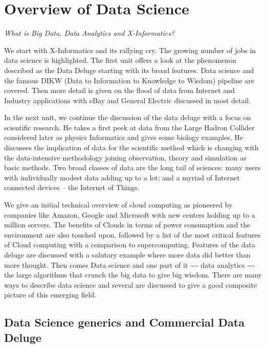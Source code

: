 

\chapter{Overview of Data Science}\label{overview-of-data-science}

\FILENAME

\emph{What is Big Data, Data Analytics and X-Informatics?}

We start with X-Informatics and its rallying cry.
The growing number of jobs in data science is highlighted. The first
unit offers a look at the phenomenon described as the Data Deluge
starting with its broad features. Data science and the famous DIKW (Data
to Information to Knowledge to Wisdom) pipeline are covered. Then more
detail is given on the flood of data from Internet and Industry
applications with eBay and General Electric discussed in most detail.

In the next unit, we continue the discussion of the data deluge with a
focus on scientific research. He takes a first peek at data from the
Large Hadron Collider considered later as physics Informatics and gives
some biology examples. He discusses the implication of data for the
scientific method which is changing with the data-intensive methodology
joining observation, theory and simulation as basic methods. Two broad
classes of data are the long tail of sciences: many users with
individually modest data adding up to a lot; and a myriad of Internet
connected devices -- the Internet of
Things.

We give an initial technical overview of cloud computing as pioneered by
companies like Amazon, Google and Microsoft with new centers holding up
to a million servers. The benefits of Clouds in terms of power
consumption and the environment are also touched upon, followed by a
list of the most critical features of Cloud computing with a comparison
to supercomputing. Features of the data deluge are discussed with a
salutary example where more data did better than more thought. Then
comes Data science and one part of it \textasciitilde{}\textasciitilde{}
data analytics \textasciitilde{}\textasciitilde{} the large algorithms
that crunch the big data to give big wisdom. There are many ways to
describe data science and several are discussed to give a good composite
picture of this emerging field.

\section{Data Science generics and Commercial Data
Deluge}\label{data-science-generics-and-commercial-data-deluge}

